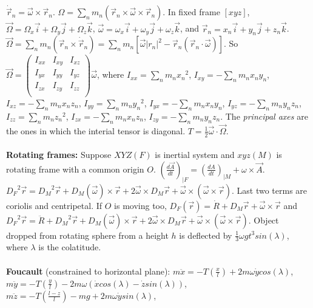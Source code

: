 $\dot{\vec r}_n = {\vec \omega} \times {\vec r_n}$.
$\Omega = \sum_n m_n ({\vec r_n} \times {\vec \omega} \times {\vec r_n})$.
In fixed frame $[xyz]$, ${\vec \Omega}= \Omega_x {\vec i} + \Omega_y {\vec j} + \Omega_z {\vec k}$,
${\vec \omega}= \omega_x {\vec i} + \omega_y {\vec j} + \omega_z {\vec k}$, and
${\vec r_n}= x_n {\vec i} + y_n {\vec j} + z_n {\vec k}$.
${\vec \Omega} = \sum_n m_n ({\vec r_n} \times \dot{\vec r}_n)=
\sum_n m_n[{\vec \omega} |r_n|^2 - {\vec r_n} ({\vec r_n} \cdot {\vec \omega})]$. So
${\vec \Omega} = 
\left(
\begin{array}{ccc}
I_{xx} & I_{xy} & I_{xz} \\
I_{yx} & I_{yy} & I_{yz} \\
I_{zx} & I_{zy} & I_{zz} \\
\end{array}
\right) {\vec \omega}
$, where 
$I_{xx} = \sum_n m_n {x_n}^2$,
$I_{xy} = -\sum_n m_n x_n y_n$,
$I_{xz} = -\sum_n m_n x_n z_n$,
$I_{yy} = \sum_n m_n {y_n}^2$,
$I_{yx} = -\sum_n m_n x_n y_n$,
$I_{yz} = -\sum_n m_n y_n z_n$,
$I_{zz} = \sum_n m_n {z_n}^2$,
$I_{zx} = -\sum_n m_n x_n z_n$,
$I_{zy} = -\sum_n m_n y_n z_n$.  The \emph{principal axes} are the ones in which the interial tensor is diagonal.
$T = {\frac 1 2} {\vec \omega} \cdot {\vec \Omega}$.
\\
\\
{\bf Rotating frames:}
Suppose $XYZ (F)$ is inertial system and $xyz (M)$ is rotating frame with
a common origin $O$.
$({\frac {d{\vec A}} {dt}})_{|F} =({\frac {dA} {dt}})_{|M} + \omega \times \vec {A}$.
$ {D_F}^2 \vec{r}= {D_M}^2 \vec{r} + {D_M} (\vec{ \omega} ) \times \vec {r}+
2 \vec{ \omega} \times {D_M} \vec{r}+
\vec{\omega} \times (\vec{\omega} \times \vec{r})$.  Last two terms are coriolis and
centripetal.  If $O$ is moving too,
$D_F (\vec{r})= \dot{R} +D_M  \vec{r} + \vec { \omega} \times \vec{r}$ and
$ {D_F}^2 \vec{r}= \ddot{R} + {D_M}^2 \vec{r} + {D_M} (\vec{ \omega}) \times \vec {r}+
2 \vec{ \omega} \times {D_M} \vec{r}+
\vec{\omega} \times (\vec{\omega} \times \vec{r})$.  Object dropped from rotating sphere from
a height $h$ is
deflected by ${\frac 1 3} \omega g t^3 sin( \lambda)$, 
where $\lambda$ is the colatitude.
\\
\\
{\bf Foucault} (constrained to horizontal plane):
$m \ddot{x} = -T ({\frac x l}) + 2m \omega \dot {y} cos ( \lambda )$,
$m \ddot{y} = -T ({\frac y l}) - 2m \omega (\dot{x} cos (\lambda )- \dot{z} sin (\lambda ))$,
$m \ddot{z} = -T ({\frac {l-z} l}) -mg + 2m \omega \dot {y} sin ( \lambda )$,
